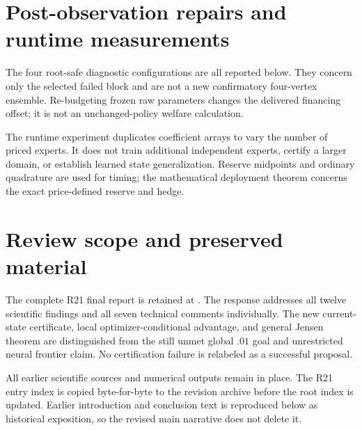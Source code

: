 \section{Post-observation repairs and runtime measurements}
The four root-safe diagnostic configurations are all reported below. They concern only the selected failed block and are not a new confirmatory four-vertex ensemble. Re-budgeting frozen raw parameters changes the delivered financing offset; it is not an unchanged-policy welfare calculation.


The runtime experiment duplicates coefficient arrays to vary the number of priced experts. It does not train additional independent experts, certify a larger domain, or establish learned state generalization. Reserve midpoints and ordinary quadrature are used for timing; the mathematical deployment theorem concerns the exact price-defined reserve and hedge.

\section{Review scope and preserved material}
The complete R21 final report is retained at . The response addresses all twelve scientific findings and all seven technical comments individually. The new current-state certificate, local optimizer-conditional advantage, and general Jensen theorem are distinguished from the still unmet global $.01$ goal and unrestricted neural frontier claim. No certification failure is relabeled as a successful proposal.

All earlier scientific sources and numerical outputs remain in place. The R21 entry index is copied byte-for-byte to the revision archive before the root index is updated. Earlier introduction and conclusion text is reproduced below as historical exposition, so the revised main narrative does not delete it.
